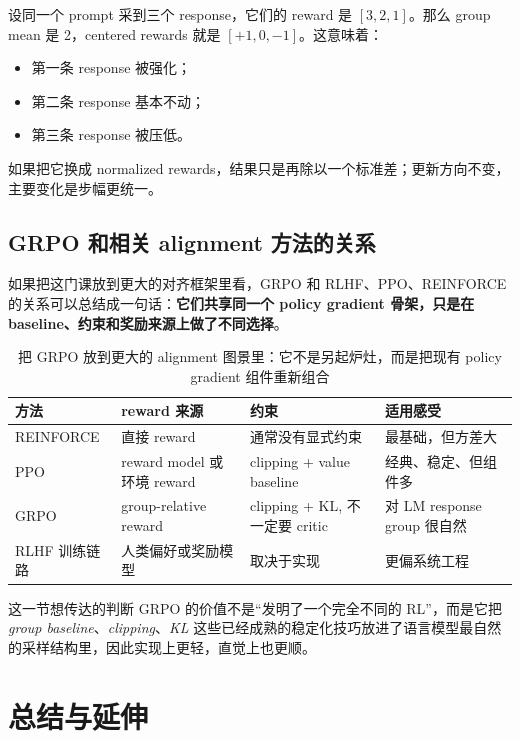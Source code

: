 \documentclass[a4paper]{article}
\begin{document}
设同一个 prompt 采到三个 response，它们的 reward 是 $[3,2,1]$。那么 group mean 是 2，centered rewards 就是 $[+1,0,-1]$。这意味着：
\begin{itemize}
    \item 第一条 response 被强化；
    \item 第二条 response 基本不动；
    \item 第三条 response 被压低。
\end{itemize}

如果把它换成 normalized rewards，结果只是再除以一个标准差；更新方向不变，主要变化是步幅更统一。


\subsection{GRPO 和相关 alignment 方法的关系}

如果把这门课放到更大的对齐框架里看，GRPO 和 RLHF、PPO、REINFORCE 的关系可以总结成一句话：\textbf{它们共享同一个 policy gradient 骨架，只是在 baseline、约束和奖励来源上做了不同选择}。

\begin{table}[H]
\centering
\begin{tabular}{@{}p{2.7cm}p{3.7cm}p{3.7cm}p{3.5cm}@{}}
\toprule
\textbf{方法} & \textbf{reward 来源} & \textbf{约束} & \textbf{适用感受} \\
\midrule
REINFORCE & 直接 reward & 通常没有显式约束 & 最基础，但方差大 \\
PPO & reward model 或环境 reward & clipping + value baseline & 经典、稳定、但组件多 \\
GRPO & group-relative reward & clipping + KL, 不一定要 critic & 对 LM response group 很自然 \\
RLHF 训练链路 & 人类偏好或奖励模型 & 取决于实现 & 更偏系统工程 \\
\bottomrule
\end{tabular}
\caption{把 GRPO 放到更大的 alignment 图景里：它不是另起炉灶，而是把现有 policy gradient 组件重新组合}
\end{table}

\begin{importantbox}{这一节想传达的判断}
GRPO 的价值不是“发明了一个完全不同的 RL”，而是它把 \emph{group baseline}、\emph{clipping}、\emph{KL} 这些已经成熟的稳定化技巧放进了语言模型最自然的采样结构里，因此实现上更轻，直觉上也更顺。
\end{importantbox}

\section{总结与延伸}
\end{document}

